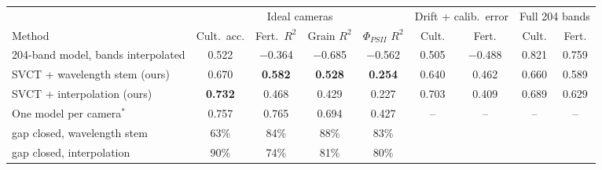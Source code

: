 \begin{tabular}{@{}lcccccccc@{}}
\toprule
 & \multicolumn{4}{c}{Ideal cameras} & \multicolumn{2}{c}{Drift + calib.\ error} & \multicolumn{2}{c}{Full 204 bands} \\
\cmidrule(lr){2-5}\cmidrule(lr){6-7}\cmidrule(l){8-9}
Method & Cult.\ acc. & Fert.\ $R^2$ & Grain $R^2$ & $\Phi_{PSII}$ $R^2$ & Cult. & Fert. & Cult. & Fert. \\
\midrule
204-band model, bands interpolated & 0.522 & $-$0.364 & $-$0.685 & $-$0.562 & 0.505 & $-$0.488 & 0.821 & 0.759 \\
SVCT + wavelength stem (ours) & 0.670 & \textbf{0.582} & \textbf{0.528} & \textbf{0.254} & 0.640 & 0.462 & 0.660 & 0.589 \\
SVCT + interpolation (ours) & \textbf{0.732} & 0.468 & 0.429 & 0.227 & 0.703 & 0.409 & 0.689 & 0.629 \\
One model per camera$^\ast$ & 0.757 & 0.765 & 0.694 & 0.427 & -- & -- & -- & -- \\
\midrule
\quad gap closed, wavelength stem & 63\% & 84\% & 88\% & 83\% & & & & \\
\quad gap closed, interpolation & 90\% & 74\% & 81\% & 80\% & & & & \\
\bottomrule
\end{tabular}
